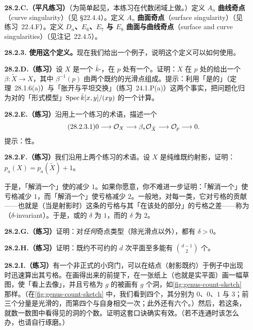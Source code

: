\textbf{28.2.C.（平凡练习）}\quad （为简单起见，本练习在代数闭域上做。）定义 $A_n$ \textbf{曲线奇点}（curve singularity）（见 \S22.4.4）。定义 $A_n$ \textbf{曲面奇点}（surface singularity）（见\mbox{练习~22.4.F}）。定义 \textbf{$D_n$、$E_6$、$E_7$ 与 $E_8$ 曲面与曲线奇点}（surface and curve singularities）（见\mbox{注记~22.4.5}）。

\textbf{28.2.3. 使用这个定义。}\quad 现在我们给出一个例子，说明这个定义可以如何使用。

\textbf{28.2.D.（练习）}\quad 设 $X$ 是一个 $\bar{k}$-\trVariety，在\trClosedPoint{} $p$ 处有一个\trNode。证明：$X$ 在 $p$ 处的\trBlowup{}给出一个\trMorphism{} $\beta\colon\tilde{X}\to X$，其中\trExceptionalDivisor{} $\beta^{-1}(p)$ 由两个既约的光滑点组成。提示：利用「\trCompletion{}是\trFlat{}的」（\mbox{定理~28.1.6}(a)）与「胀开与平坦\trBaseChange{}交换」（\mbox{练习~24.1.P}(a)）这两个事实，把问题化归为对\trNode{}的「形式模型」$\operatorname{Spec}\bar{k}[x,y]/(xy)$ 的一个计算。

\textbf{28.2.E.（练习）}\quad 沿用上一个练习的术语，描述一个\trExactSequence
\begin{equation*}
\tag{28.2.3.1}\label{eq:node-blowup-ses}
0\longrightarrow\mathcal{O}_X\longrightarrow\beta_*\mathcal{O}_{\tilde{X}}\longrightarrow\mathcal{O}_p\longrightarrow 0.
\end{equation*}
提示：\trFaithfullyFlat{}性。

\textbf{28.2.F.（练习）}\quad 我们沿用上两个练习的术语。设 $X$ 是纯维既约射影\trCurve，证明：$p_a(X)=p_a(\tilde{X})+1$。

于是，「解消一个\trNode」使\trCurve{}的\trArithmeticGenus{}减少 $1$。如果你愿意，你不难进一步证明：「解消一个\trCusp」使亏格减少 $1$，而「解消一个\trTacnode」使亏格减少 $2$。一般地，对每一类\trCurve\trSingularPoint，它对亏格的贡献——也就是（当\trCurve{}是射影时）这条\trCurve{}的亏格与其「在该\trSingularPoint{}处的部分\trNormalization」的亏格之差——称为\textbf{\trDeltaInvariant}（$\delta$-invariant）。于是，\trNode{}或\trCusp{}的 $\delta$ 为 $1$，而\trTacnode{}的 $\delta$ 为 $2$。

\textbf{28.2.G.（练习）}\quad 证明：对\emph{任何}奇点类型（除光滑点以外），都有 $\delta>0$。

\textbf{28.2.H.（练习）}\quad 证明：既约不可约的 $d$ 次平面\trCurve{}至多能有 $\binom{d-1}{2}$ 个\trSingularPoint。

\textbf{28.2.I.（练习）}\quad 有一个非正式的小窍门，可以在结点（射影既约）\trCurve{}于例子中出现时迅速算出其亏格。在画得出来的前提下，在一张纸上（也就是实平面）画一幅草图，使\trNode{}「看上去像\trNode」，并且亏格为 $g$ 的\trCurve{}被画有 $g$ 个洞，如\cref{fig:genus-count-sketch} 那样。（在\cref{fig:genus-count-sketch} 中，我们看到四个\trIrreducibleComponent，其\trGeometricGenus{}分别为 $0$、$0$、$1$ 与 $3$；前三个分量是光滑的，而第四个与自身相交一次；此外还有六个\trNode。）然后，若这条\trCurve{}\trConnected，就数一数图中看得见的洞的个数。证明这套口诀确实有效。（若\trCurve{}不连通时该怎么办，也请自行琢磨。）

